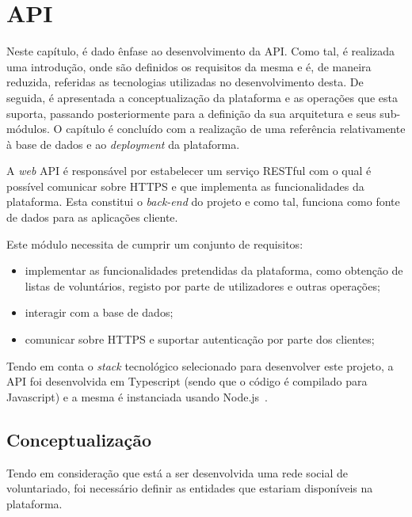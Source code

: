\section{API}

Neste capítulo, é dado ênfase ao desenvolvimento da API. Como tal, é realizada uma introdução, onde são definidos os requisitos da mesma e é, de maneira reduzida, referidas as tecnologias utilizadas no desenvolvimento desta. De seguida, é apresentada a conceptualização da plataforma e as operações que esta suporta, passando posteriormente para a definição da sua arquitetura e seus sub-módulos. O capítulo é concluído com a realização de uma referência relativamente à base de dados e ao \textit{deployment} da plataforma.

\medskip \par

A \textit{web} API é responsável por estabelecer um serviço RESTful com o qual é possível comunicar sobre HTTPS e que implementa as funcionalidades da plataforma. Esta constitui o \textit{back-end} do projeto e como tal, funciona como fonte de dados para as aplicações cliente.

\medskip \par

Este módulo necessita de cumprir um conjunto de requisitos:

\begin{itemize}
	\item implementar as funcionalidades pretendidas da plataforma, como obtenção de listas de voluntários, registo por parte de utilizadores e outras operações;
	\item interagir com a base de dados;
	\item comunicar sobre HTTPS e suportar autenticação por parte dos clientes;
\end{itemize}

\medskip \par

Tendo em conta o \textit{stack} tecnológico selecionado para desenvolver este projeto, a API foi  desenvolvida em Typescript (sendo que o código é compilado para Javascript) e a mesma é instanciada usando Node.js~\cite{Wilson2018}.

\subsection{Conceptualização}

Tendo em consideração que está a ser desenvolvida uma rede social de voluntariado, foi necessário definir as entidades que estariam disponíveis na plataforma. 

